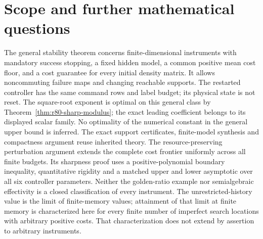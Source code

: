 \maketitle


















\section{Scope and further mathematical questions}
\label{sec:r73-scope}\label{sec:r74-scope}\label{sec:r75-scope}\label{sec:r76-scope}\label{sec:r77-scope}\label{sec:r78-scope}\label{sec:r79-scope}\label{sec:r80-scope}
The general stability theorem concerns finite-dimensional instruments
with mandatory success stopping, a fixed hidden model, a common positive
mean cost floor, and a cost guarantee for every initial density matrix.
It allows noncommuting failure maps and changing reachable supports.
The restarted controller has the same command rows and label budget;
its physical state is not reset.  The square-root exponent is optimal on this general class by
Theorem~\ref{thm:r80-sharp-modulus}; the exact leading coefficient
belongs to its displayed scalar family.  No optimality of the numerical
constant in the general upper bound is inferred.  The exact support
certificates, finite-model synthesis and compactness argument reuse
inherited theory.  The resource-preserving perturbation argument extends the complete
cost frontier uniformly across all finite budgets.  Its sharpness proof
uses a positive-polynomial boundary inequality, quantitative rigidity and
a matched upper and lower asymptotic over all six controller parameters.
Neither the golden-ratio example nor semialgebraic effectivity is a
closed classification of every instrument.  The unrestricted-history
value is the limit of finite-memory values; attainment of that limit
at finite memory is characterized here for every finite number of
imperfect search locations with arbitrary positive costs.  That characterization
does not extend by assertion to arbitrary instruments.


